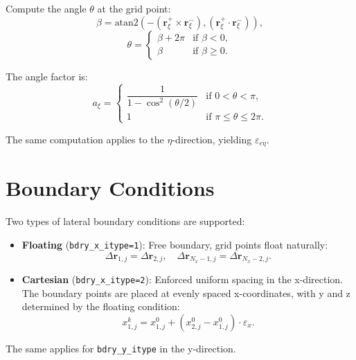 \documentclass[11pt,a4paper]{report}
\newcommand{\rvec}{\bm{r}}
\begin{document}
Compute the angle $\theta$ at the grid point:
\begin{equation}
    \beta = \text{atan2}(-(\rvec_\xi^+ \times \rvec_\xi^-), (\rvec_\xi^+ \cdot \rvec_\xi^-)),
\end{equation}
\begin{equation}
    \theta = \begin{cases} \beta + 2\pi & \text{if } \beta < 0, \\ \beta & \text{if } \beta \ge 0. \end{cases}
\end{equation}

The angle factor is:
\begin{equation}
    a_\xi = \begin{cases} \dfrac{1}{1 - \cos^2(\theta/2)} & \text{if } 0 < \theta < \pi, \\ 1 & \text{if } \pi \le \theta \le 2\pi. \end{cases}
\end{equation}

The same computation applies to the $\eta$-direction, yielding $\varepsilon_{e\eta}$.

\section{Boundary Conditions}

Two types of lateral boundary conditions are supported:

\begin{itemize}
    \item \textbf{Floating} (\texttt{bdry\_x\_itype=1}): Free boundary, grid points float naturally:
    \begin{equation}
        \Delta \rvec_{1,j} = \Delta \rvec_{2,j}, \quad \Delta \rvec_{N_x-1,j} = \Delta \rvec_{N_x-2,j}.
    \end{equation}

    \item \textbf{Cartesian} (\texttt{bdry\_x\_itype=2}): Enforced uniform spacing in the x-direction. The boundary points are placed at evenly spaced x-coordinates, with y and z determined by the floating condition:
    \begin{equation}
        x_{1,j}^k = x_{1,j}^0 + (x_{2,j}^0 - x_{1,j}^0) \cdot \varepsilon_x.
    \end{equation}
\end{itemize}

The same applies for \texttt{bdry\_y\_itype} in the y-direction.
\end{document}
